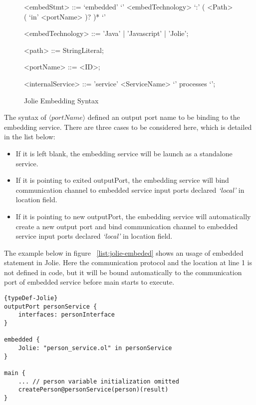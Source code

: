 \begin{figure}[ht]
    \begin{framed}
        \begin{grammar}
            <embedStmt> ::= `embedded' `{' <embedTechnology> `:' ( <Path> ( `in' <portName> )? )* `}'

            <embedTechnology> ::= 'Java' | 'Javascript' | 'Jolie';

            <path> ::= StringLiteral;

            <portName> ::= <ID>;

            <internalService>
            ::= 'service' <ServiceName> `{' processes `}';
        \end{grammar}
    \end{framed}
    \caption{Jolie Embedding Syntax}
    \label{fig:embedded-syntax}
\end{figure}

The syntax of \(\langle portName \rangle\) defined an output port name to be binding to the embedding service. There are three cases to be considered here, which is detailed in the list below:

\begin{itemize}
    \item If it is left blank, the embedding service will be launch as a standalone service.
    \item If it is pointing to exited outputPort, the embedding service will bind communication channel to embedded service input ports declared \textit{`local'} in location field.
    \item If it is pointing to new outputPort, the embedding service will automatically create a new output port and bind communication channel to embedded service input ports declared \textit{`local'} in location field.
\end{itemize}

The example below in figure ~\ref{list:jolie-embeded} shows an usage of embedded statement in Jolie. Here the communication protocol and the location at line 1 is not defined in code, but it will be bound automatically to the communication port of embedded service before main starts to execute. 

\begin{listing}[ht]

\lstset{language=Jolie,
    style=codeStyle,
    numbers=left,
    firstnumber=1
}
\begin{lstlisting}[frame=tlrb, caption= {Jolie Embedding example}, label={list:jolie-embeded} ]{typeDef-Jolie}
outputPort personService {
    interfaces: personInterface
}

embedded {
    Jolie: "person_service.ol" in personService
}

main {
    ... // person variable initialization omitted
    createPerson@personService(person)(result)
}
\end{lstlisting}
\end{listing}

\FloatBarrier
